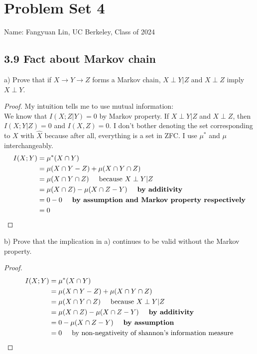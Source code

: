 \documentclass[../main.tex]{subfiles}
\begin{document}
\section*{Problem Set 4}
    Name: Fangyuan Lin, UC Berkeley, Class of 2024

\subsection*{3.9 Fact about Markov chain}
a) Prove that if $X\to Y\to Z$ forms a Markov chain, $X\perp Y|Z$ and $X\perp Z$ imply $X\perp Y$.
\begin{proof}
    My intuition tells me to use mutual information:\\
    We know that $I(X;Z|Y)=0$ by Markov property. If $X\perp Y|Z$ and $X\perp Z$, then $I(X;Y|Z)=0$ and $I(X,Z)=0$. I don't bother denoting the set corresponding to $X$ with $\hat{X}$ because after all, everything is a set in ZFC. I use $\mu^*$ and $\mu$ interchangeably.
    \begin{align*}
        I(X;Y) &= \mu^*(X\cap Y)\\
        &= \mu(X\cap Y - Z) + \mu(X\cap Y\cap Z)\\
        &= \mu(X\cap Y\cap Z) \hspace{5mm} \text{because $X\perp Y|Z$}\\
        &= \mu(X \cap Z ) - \mu(X\cap Z-Y) \hspace{5mm} \textbf{by additivity}\\
        &= 0 - 0 \hspace{5mm}\textbf{by assumption and Markov property respectively}\\
        &=0
    \end{align*}
\end{proof}
b) Prove that the implication in a)
 continues to be valid without the Markov property.
 \begin{proof}
     \begin{align*}
        I(X;Y) &= \mu^*(X\cap Y)\\
        &= \mu(X\cap Y - Z) + \mu(X\cap Y\cap Z)\\
        &= \mu(X\cap Y\cap Z) \hspace{5mm} \text{because $X\perp Y|Z$}\\
        &= \mu(X \cap Z ) - \mu(X\cap Z-Y) \hspace{5mm} \textbf{by additivity}\\
        &= 0 -  \mu(X\cap Z-Y)\hspace{5mm}\textbf{by assumption}\\
        &=0 \hspace{5mm} \text{by non-negativeity of shannon's information measure}
    \end{align*}
 \end{proof}
\end{document}
